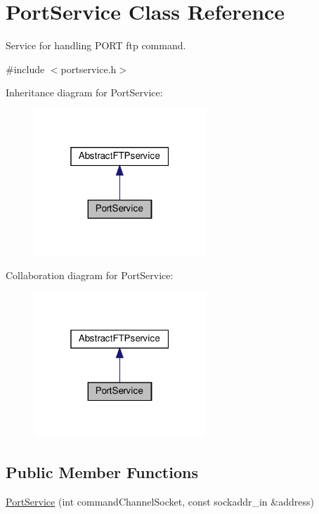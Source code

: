 \hypertarget{classPortService}{}\section{Port\+Service Class Reference}
\label{classPortService}


Service for handling P\+O\+RT ftp command.  




{\ttfamily \#include $<$portservice.\+h$>$}



Inheritance diagram for Port\+Service\+:\nopagebreak
\begin{figure}[H]
\begin{center}
\leavevmode
\includegraphics[width=184pt]{de/df6/classPortService__inherit__graph}
\end{center}
\end{figure}


Collaboration diagram for Port\+Service\+:\nopagebreak
\begin{figure}[H]
\begin{center}
\leavevmode
\includegraphics[width=184pt]{dd/dd7/classPortService__coll__graph}
\end{center}
\end{figure}
\subsection*{Public Member Functions}
\begin{DoxyCompactItemize}
\item 
\hyperlink{classPortService_aba5f1db162126817510cd4f178eb4d57}{Port\+Service} (int command\+Channel\+Socket, const sockaddr\+\_\+in \&address)
\end{DoxyCompactItemize}

